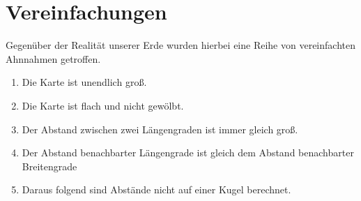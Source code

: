 \section{Vereinfachungen}

Gegenüber der Realität unserer Erde wurden hierbei eine Reihe von vereinfachten Ahnnahmen getroffen.
\begin{enumerate}
    \item Die Karte ist unendlich groß.
    \item Die Karte ist flach und nicht gewölbt.
    \item Der Abstand zwischen zwei Längengraden ist immer gleich groß.
    \item Der Abstand benachbarter Längengrade ist gleich dem Abstand benachbarter Breitengrade
    \item Daraus folgend sind Abstände nicht auf einer Kugel berechnet.
\end{enumerate}
